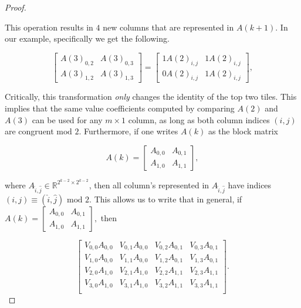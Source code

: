 \begin{proof}
\begin{center}
\end{center}

This operation results in $4$ new columns that are represented in $A(k+1)$. In our example, specifically we get the following. 

$$
\begin{bmatrix} 
    A(3)_{0,2} & A(3)_{0,3} \\ 
    A(3)_{1,2} & A(3)_{1,3} 
\end{bmatrix} = 
\begin{bmatrix} 
    1A(2)_{i,j} & 1A(2)_{i,j} \\ 
    0A(2)_{i,j} & 1A(2)_{i,j} 
\end{bmatrix},
$$

Critically, this transformation \textit{only} changes the identity of the top two tiles. This implies that the same value coefficients computed by comparing $A(2)$ and $A(3)$ can be used for any $m \times 1$ column, as long as both column indices $(i,j)$ are congruent $\text{mod } 2$. Furthermore, if one writes $A(k)$ as the block matrix

$$A(k) = \begin{bmatrix} A_{0,0} & A_{0,1} \\ A_{1,0} & A_{1,1} \end{bmatrix},$$

where $A_{\hat{i},\hat{j}} \in \mathbb{R}^{2^{k-2} \times 2^{k-2}}$, then all column's represented in $A_{\hat{i},\hat{j}}$ have indices $(i,j) \equiv (\hat{i},\hat{j}) \text{ mod } 2$. This allows us to write that in general, if $A(k) = \begin{bmatrix} A_{0,0} & A_{0,1} \\ A_{1,0} & A_{1,1} \end{bmatrix},$
then

\begin{equation}\label{eqn: coefficient matrix prod}
    \begin{bmatrix}
        V_{0,0}A_{0,0} & V_{0,1}A_{0,0} & V_{0,2}A_{0,1} & V_{0,3}A_{0,1} \\
        V_{1,0}A_{0,0} & V_{1,1}A_{0,0} & V_{1,2}A_{0,1} & V_{1,3}A_{0,1} \\
        V_{2,0}A_{1,0} & V_{2,1}A_{1,0} & V_{2,2}A_{1,1} & V_{2,3}A_{1,1} \\
        V_{3,0}A_{1,0} & V_{3,1}A_{1,0} & V_{3,2}A_{1,1} & V_{3,3}A_{1,1} \\
    \end{bmatrix}.
\end{equation}



\end{proof}
